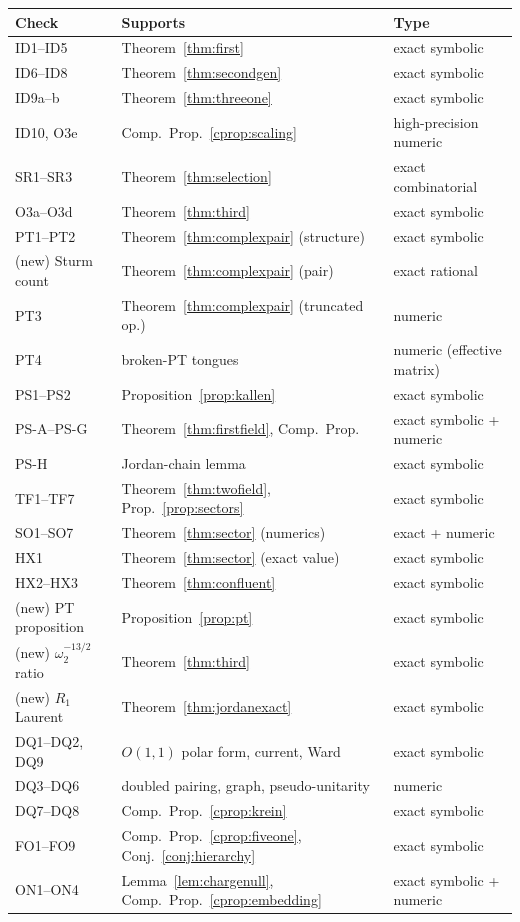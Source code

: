 \documentclass[11pt]{article}
\theoremstyle{definition}
\theoremstyle{remark}
\newcommand{\w}{\omega}
\begin{document}
\begin{center}
\small
\begin{tabular}{l l l}
\hline
Check & Supports & Type\\
\hline
ID1--ID5 & Theorem~\ref{thm:first} & exact symbolic\\
ID6--ID8 & Theorem~\ref{thm:secondgen} & exact symbolic\\
ID9a--b & Theorem~\ref{thm:threeone} & exact symbolic\\
ID10, O3e & Comp.\ Prop.~\ref{cprop:scaling} & high-precision numeric\\
SR1--SR3 & Theorem~\ref{thm:selection} & exact combinatorial\\
O3a--O3d & Theorem~\ref{thm:third} & exact symbolic\\
PT1--PT2 & Theorem~\ref{thm:complexpair} (structure) & exact symbolic\\
(new) Sturm count & Theorem~\ref{thm:complexpair} (pair) &
exact rational\\
PT3 & Theorem~\ref{thm:complexpair} (truncated op.) & numeric\\
PT4 & broken-PT tongues & numeric (effective matrix)\\
PS1--PS2 & Proposition~\ref{prop:kallen} & exact symbolic\\
PS-A--PS-G & Theorem~\ref{thm:firstfield}, Comp.\ Prop. &
exact symbolic + numeric\\
PS-H & Jordan-chain lemma & exact symbolic\\
TF1--TF7 & Theorem~\ref{thm:twofield}, Prop.~\ref{prop:sectors} &
exact symbolic\\
SO1--SO7 & Theorem~\ref{thm:sector} (numerics) & exact + numeric\\
HX1 & Theorem~\ref{thm:sector} (exact value) & exact symbolic\\
HX2--HX3 & Theorem~\ref{thm:confluent} & exact symbolic\\
(new) PT proposition & Proposition~\ref{prop:pt} & exact symbolic\\
(new) $\w_2^{-13/2}$ ratio & Theorem~\ref{thm:third} & exact symbolic\\
(new) $R_1$ Laurent & Theorem~\ref{thm:jordanexact} & exact symbolic\\
DQ1--DQ2, DQ9 & $O(1,1)$ polar form, current, Ward & exact symbolic\\
DQ3--DQ6 & doubled pairing, graph, pseudo-unitarity & numeric\\
DQ7--DQ8 & Comp.\ Prop.~\ref{cprop:krein} & exact symbolic\\
FO1--FO9 & Comp.\ Prop.~\ref{cprop:fiveone},
Conj.~\ref{conj:hierarchy} & exact symbolic\\
ON1--ON4 & Lemma~\ref{lem:chargenull},
Comp.\ Prop.~\ref{cprop:embedding} & exact symbolic + numeric\\
\hline
\end{tabular}
\end{center}
\end{document}
